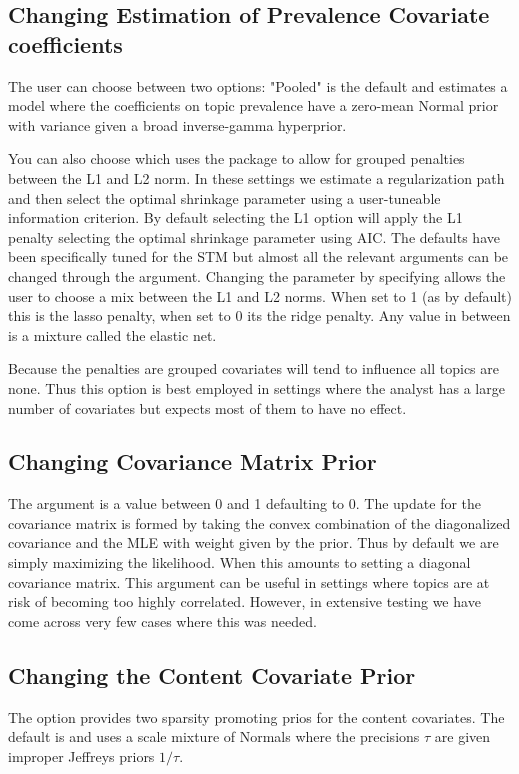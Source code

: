 \documentclass[nojss]{jss}
\begin{document}
\subsection{Changing Estimation of Prevalence Covariate coefficients}

The user can choose between two options: "Pooled" is the default and estimates a model where the coefficients on topic prevalence have a zero-mean Normal prior with variance given a broad
 inverse-gamma hyperprior.

You can also choose  which uses the  package \citep{friedman2010regularization} to allow for grouped penalties between the L1 and L2 norm. In these settings we estimate a regularization path and then select the optimal shrinkage parameter using a user-tuneable information criterion. By default selecting the L1 option will apply the L1 penalty selecting the optimal shrinkage parameter using AIC. The defaults have been specifically tuned for the STM but almost all the relevant arguments can be changed through the  argument. Changing the  parameter by specifying  allows the user to choose a mix between the L1 and L2 norms. When set to 1 (as by default) this is the lasso penalty, when set to 0 its the ridge penalty. Any value in between is a mixture called the elastic net.  

Because the penalties are grouped covariates will tend to influence all topics are none.  Thus this option is best employed in settings where the analyst has a large number of covariates but expects most of them to have no effect.

\subsection{Changing Covariance Matrix Prior}
The  argument is a value between 0 and 1 defaulting to 0.  The update for the covariance matrix is formed by taking the convex combination of the diagonalized covariance and the MLE with weight given by the prior.  Thus by default we are simply maximizing the likelihood.  When  this amounts to setting a diagonal covariance matrix.  This argument can be useful in settings where topics are at risk of becoming too highly correlated.  However, in extensive testing we have come across very few cases where this was needed.

\subsection{Changing the Content Covariate Prior}
The  option provides two sparsity promoting prios for the content covariates.  The default is  and uses a scale mixture of Normals where the precisions $\tau$ are given improper Jeffreys priors $1/\tau$.  
\end{document}
